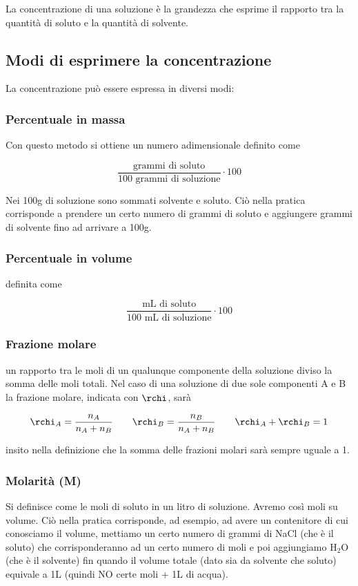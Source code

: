 La concentrazione di una soluzione è la grandezza che esprime il rapporto tra la quantità di soluto e la quantità di solvente.
\subsection{Modi di esprimere la concentrazione}
La concentrazione può essere espressa in diversi modi:
\subsubsection{Percentuale in massa}
Con questo metodo si ottiene un numero adimensionale definito come

$$ \frac{\text{grammi di soluto}}{100\text{ grammi di soluzione}} \cdot 100$$

Nei 100g di soluzione sono sommati solvente e soluto. Ciò nella pratica corrisponde a prendere un certo numero di grammi di soluto e aggiungere grammi di solvente fino ad arrivare a 100g.
\subsubsection{Percentuale in volume}
\E definita come

$$ \frac{\text{mL di soluto}}{100\text{ mL di soluzione}} \cdot 100$$

\subsubsection{Frazione molare}
\E un rapporto tra le moli di un qualunque componente della soluzione diviso la somma delle moli totali. Nel caso di una soluzione di due sole componenti A e B la frazione molare, indicata con $\rchi$, sarà

$$\rchi_A=\frac{n_A}{n_A + n_B}
\qquad
\rchi_B=\frac{n_B}{n_A + n_B}
\qquad
\rchi_A + \rchi_B = 1$$

\E insito nella definizione che la somma delle frazioni molari sarà sempre uguale a 1.
\subsubsection{Molarità (M)}
Si definisce come le moli di soluto in un litro di soluzione. Avremo così moli su volume. Ciò nella pratica corrisponde, ad esempio, ad avere un contenitore di cui conosciamo il volume, mettiamo un certo numero di grammi di NaCl (che è il soluto) che corrisponderanno ad un certo numero di moli e poi aggiungiamo H$_2$O (che è il solvente) fin quando il volume totale (dato sia da solvente che soluto) equivale a 1L (quindi NO certe moli + 1L di acqua).
